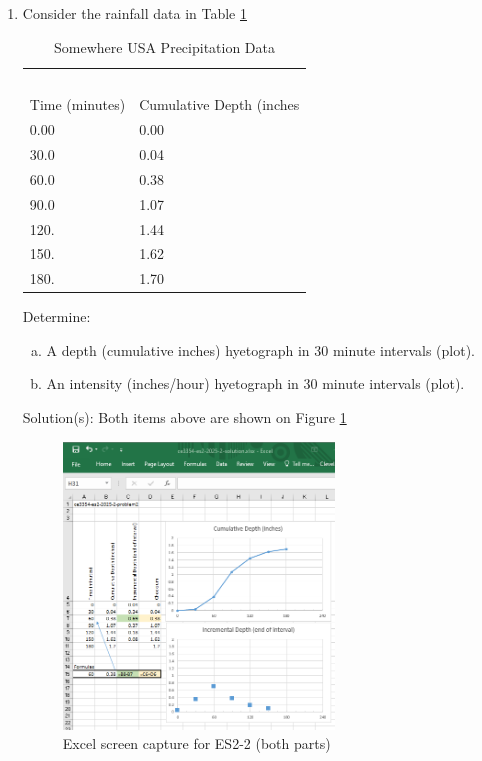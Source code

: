 \documentclass[12pt]{article}
\begin{document}
\begin{enumerate}
\begin{enumerate}[a)]
\end{enumerate}

\clearpage

\item Consider the rainfall data in Table \ref{tab:SomewhereUSARain}

\begin{table}[h!]
\centering
\caption{Somewhere USA Precipitation Data}
\begin{tabular}{p{2.0in}p{2.0in}} %
~&~\\
Time (minutes) & Cumulative Depth (inches\\
\hline
\hline
0.00 & 0.00 \\
30.0 & 0.04 \\
60.0 & 0.38 \\
90.0 & 1.07 \\
120. & 1.44 \\
150. & 1.62 \\
180. & 1.70 \\
\hline
\end{tabular}
\label{tab:SomewhereUSARain}
\end{table}

Determine:
    \begin{enumerate}[a)]
        \item A depth (cumulative inches) hyetograph in 30 minute intervals (plot). 
        \item An intensity (inches/hour) hyetograph in 30 minute intervals (plot).
    \end{enumerate}

Solution(s):
Both items above are shown on Figure \ref{fig:es2-2}

\begin{figure}[h!] %
   \centering
   \includegraphics[height=3in]{ES2-2.png} 
   \caption{Excel screen capture for ES2-2 (both parts)}
   \label{fig:es2-2}
\end{figure}


\end{enumerate}
\end{document}
